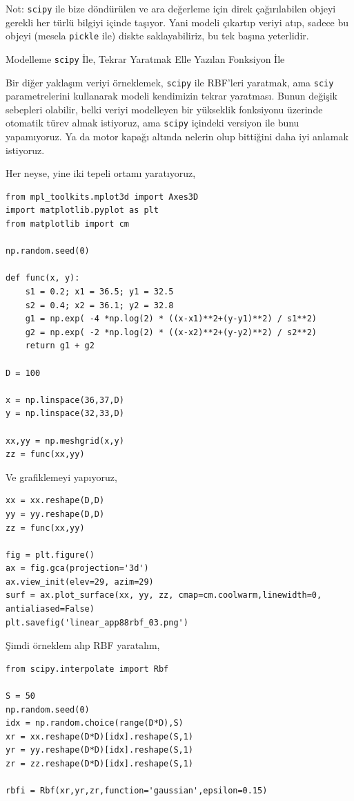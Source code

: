 \documentclass[12pt,fleqn]{article}\usepackage{../../common}
\begin{document}
Not: \verb!scipy! ile bize döndürülen ve ara değerleme için direk
çağırılabilen objeyi gerekli her türlü bilgiyi içinde taşıyor. Yani modeli
çıkartıp veriyi atıp, sadece bu objeyi (mesela \verb!pickle! ile) diskte
saklayabiliriz, bu tek başına yeterlidir.

Modelleme \verb!scipy! İle, Tekrar Yaratmak Elle Yazılan Fonksiyon İle

Bir diğer yaklaşım veriyi örneklemek, \verb!scipy! ile RBF'leri yaratmak,
ama \verb!sciy! parametrelerini kullanarak modeli kendimizin tekrar
yaratması. Bunun değişik sebepleri olabilir, belki veriyi modelleyen bir
yükseklik fonksiyonu üzerinde otomatik türev almak istiyoruz, ama
\verb!scipy! içindeki versiyon ile bunu yapamıyoruz. Ya da motor kapağı
altında nelerin olup bittiğini daha iyi anlamak istiyoruz. 

Her neyse, yine iki tepeli ortamı yaratıyoruz, 

\begin{verbatim}
from mpl_toolkits.mplot3d import Axes3D
import matplotlib.pyplot as plt
from matplotlib import cm

np.random.seed(0)

def func(x, y):
    s1 = 0.2; x1 = 36.5; y1 = 32.5
    s2 = 0.4; x2 = 36.1; y2 = 32.8
    g1 = np.exp( -4 *np.log(2) * ((x-x1)**2+(y-y1)**2) / s1**2)
    g2 = np.exp( -2 *np.log(2) * ((x-x2)**2+(y-y2)**2) / s2**2)    
    return g1 + g2 

D = 100

x = np.linspace(36,37,D)
y = np.linspace(32,33,D)

xx,yy = np.meshgrid(x,y)
zz = func(xx,yy)
\end{verbatim}

Ve grafiklemeyi yapıyoruz,

\begin{verbatim}
xx = xx.reshape(D,D)
yy = yy.reshape(D,D)
zz = func(xx,yy)

fig = plt.figure()
ax = fig.gca(projection='3d')
ax.view_init(elev=29, azim=29)
surf = ax.plot_surface(xx, yy, zz, cmap=cm.coolwarm,linewidth=0, antialiased=False)
plt.savefig('linear_app88rbf_03.png')
\end{verbatim}

Şimdi örneklem alıp RBF yaratalım,

\begin{verbatim}
from scipy.interpolate import Rbf

S = 50
np.random.seed(0)
idx = np.random.choice(range(D*D),S)
xr = xx.reshape(D*D)[idx].reshape(S,1)
yr = yy.reshape(D*D)[idx].reshape(S,1)
zr = zz.reshape(D*D)[idx].reshape(S,1)

rbfi = Rbf(xr,yr,zr,function='gaussian',epsilon=0.15)
\end{verbatim}
\end{document}
